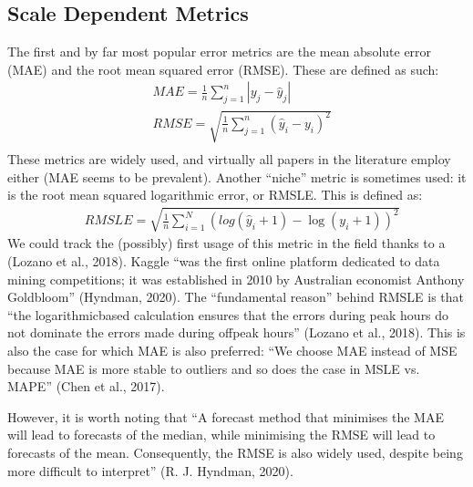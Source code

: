\documentclass[letterpaper,10pt,english]{jupyterBook}
\begin{document}
\subsection{Scale Dependent Metrics}
\label{\detokenize{06-forecasting:scale-dependent-metrics}}
\sphinxAtStartPar
The first and by far most popular error metrics are the mean absolute error (MAE) and the root mean squared error (RMSE). These are defined as such:
\label{equation:06-forecasting:3eeb7571-f7f8-4865-8f09-db29568783c2}\begin{align}
&MAE = \frac{1}{n}\sum_{j = 1}^n \left| {{y_j} - {{\hat y}_j}} \right|\\
&RMSE=\sqrt{\frac{1}{n}\sum_{j=1}^{n}(\hat{y}_{i}-y_{i})^{2}}\\
\end{align}
\sphinxAtStartPar
These metrics are widely used, and virtually all papers in the literature employ either (MAE seems to be prevalent). Another “niche” metric is sometimes used: it is the root mean squared logarithmic error, or RMSLE. This is defined as:
\label{equation:06-forecasting:8ab9ebe9-1bdf-435f-80b3-3bd488d0aeb5}\begin{align}
&RMSLE =\sqrt{\frac{1}{n}\sum_{i=1}^{N}(log(\hat{y}_{i}+1)-\log(y_{i}+1))^{2}}
\end{align}
\sphinxAtStartPar
We could track the (possibly) first usage of this metric in the field thanks to a  (Lozano et al., 2018). Kaggle “was the first online platform dedicated to data mining competitions; it was established in 2010 by Australian economist Anthony Goldbloom” (Hyndman, 2020). The “fundamental reason” behind RMSLE is that “the logarithmic\sphinxhyphen{}based calculation ensures that the errors during peak hours do not dominate the errors made during off\sphinxhyphen{}peak hours” (Lozano et al., 2018). This is also the case for which MAE is also preferred: “We choose MAE instead of MSE because MAE is more stable to outliers and so does the case in MSLE vs. MAPE” (Chen et al., 2017).

\sphinxAtStartPar
However, it is worth noting that “A forecast method that minimises the MAE will lead to forecasts of the median, while minimising the RMSE will lead to forecasts of the mean. Consequently, the RMSE is also widely used, despite being more difficult to interpret” (R. J. Hyndman, 2020).
\end{document}
